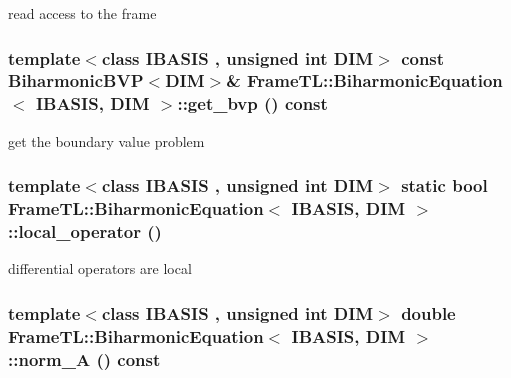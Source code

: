 read access to the frame \hypertarget{classFrameTL_1_1BiharmonicEquation_b688202abfc6f7d72a04dbf365ba6809}{
\subsubsection[{get\_\-bvp}]{\setlength{\rightskip}{0pt plus 5cm}template$<$class IBASIS , unsigned int DIM$>$ const BiharmonicBVP$<$DIM$>$\& {\bf FrameTL::BiharmonicEquation}$<$ IBASIS, DIM $>$::get\_\-bvp () const}}
\label{classFrameTL_1_1BiharmonicEquation_b688202abfc6f7d72a04dbf365ba6809}


get the boundary value problem \hypertarget{classFrameTL_1_1BiharmonicEquation_9d20dc4a94ba5719b1a25c92e8faba10}{
\subsubsection[{local\_\-operator}]{\setlength{\rightskip}{0pt plus 5cm}template$<$class IBASIS , unsigned int DIM$>$ static bool {\bf FrameTL::BiharmonicEquation}$<$ IBASIS, DIM $>$::local\_\-operator ()}}
\label{classFrameTL_1_1BiharmonicEquation_9d20dc4a94ba5719b1a25c92e8faba10}


differential operators are local \hypertarget{classFrameTL_1_1BiharmonicEquation_14e15fda0b1f3cc901cb3a3026ceb536}{
\subsubsection[{norm\_\-A}]{\setlength{\rightskip}{0pt plus 5cm}template$<$class IBASIS , unsigned int DIM$>$ double {\bf FrameTL::BiharmonicEquation}$<$ IBASIS, DIM $>$::norm\_\-A () const}}
\label{classFrameTL_1_1BiharmonicEquation_14e15fda0b1f3cc901cb3a3026ceb536}


